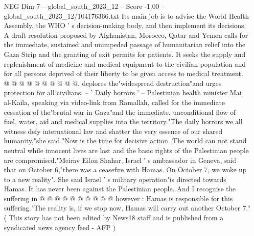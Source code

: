 \begin{textsample}{NEG Dim 7 – global\_south\_2023\_12 – Score -1.00 – global\_south\_2023\_12/104176366.txt}
Its main job is to advise the World Health Assembly, the WHO ' s decision-making body, and then implement its decisions.
A draft resolution proposed by Afghanistan, Morocco, Qatar and Yemen calls for the immediate, sustained and unimpeded passage of humanitarian relief into the Gaza Strip and the granting of exit permits for patients.
It seeks the supply and replenishment of medicine and medical equipment to the civilian population and for all persons deprived of their liberty to be given access to medical treatment. @ @ @ @ @ @ @ @ @ @, deplores the"widespread destruction"and urges protection for all civilians. -- ' Daily horrors ' -- Palestinian health minister Mai al-Kaila, speaking via video-link from Ramallah, called for the immediate cessation of the"brutal war in Gaza"and the immediate, unconditional flow of fuel, water, aid and medical supplies into the territory."The daily horrors we all witness defy international law and shatter the very essence of our shared humanity,"she said."Now is the time for decisive action.
The world can not stand neutral while innocent lives are lost and the basic rights of the Palestinian people are compromised."Meirav Eilon Shahar, Israel ' s ambassador in Geneva, said that on October 6,"there was a ceasefire with Hamas.
On October 7, we woke up to a new reality".
She said Israel ' s military operation"is directed towards Hamas.
It has never been against the Palestinian people.
And I recognise the suffering in @ @ @ @ @ @ @ @ @ @ however : Hamas is responsible for this suffering."The reality is, if we stop now, Hamas will carry out another October 7."( This story has not been edited by News18 staff and is published from a syndicated news agency feed - AFP )

\end{textsample}
